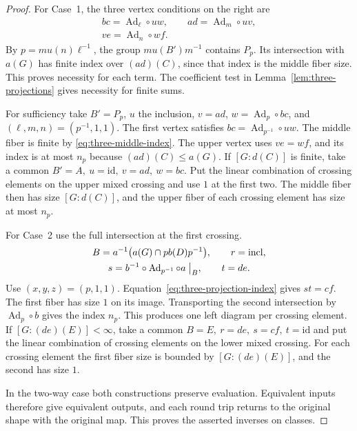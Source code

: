 \documentclass[11pt,a4paper]{article}
\numberwithin{equation}{section}
\theoremstyle{definition}
\newcommand{\id}{\mathrm{id}}
\begin{document}
\begin{proof}
For Case~1, the three vertex conditions on the right are
\[
 \begin{gathered}
 bc=\operatorname{Ad}_{\ell}\circ uw,\qquad
 ad=\operatorname{Ad}_{m}\circ uv,\\
 ve=\operatorname{Ad}_{n}\circ wf .
 \end{gathered}
\]
By \(p=m u(n)\ell^{-1}\), the group \(m u(B')m^{-1}\)
contains \(P_p\). Its intersection with \(a(G)\) has finite index
over \((ad)(C)\), since that index is the middle fiber size.
This proves necessity for each term. The coefficient test in
Lemma~\ref{lem:three-projections} gives necessity for finite sums.

For sufficiency take \(B'=P_p\), \(u\) the inclusion, \(v=ad\),
\(w=\operatorname{Ad}_p\circ bc\), and \((\ell,m,n)=(p^{-1},1,1)\).
The first vertex satisfies \(bc=\operatorname{Ad}_{p^{-1}}\circ uw\).
The middle fiber is finite by \eqref{eq:three-middle-index}.
The upper vertex uses \(ve=wf\), and its index is at most \(n_p\)
because \((ad)(C)\le a(G)\). If \([G:d(C)]\) is finite, take a
common \(B'=A,\ u=\id,\ v=ad,\ w=bc\). Put the linear combination
of crossing elements on the upper mixed crossing and use \(1\) at the first two.
The middle fiber then has size \([G:d(C)]\), and the upper fiber
of each crossing element has size at most \(n_p\).

For Case~2 use the full intersection at the first crossing.
\[
 \begin{gathered}
 B=a^{-1}\bigl(a(G)\cap p b(D)p^{-1}\bigr),\qquad r=\mathrm{incl},\\
 s=b^{-1}\circ\operatorname{Ad}_{p^{-1}}\circ a\bigm|_B,\qquad t=de.
 \end{gathered}
\]
Use \((x,y,z)=(p,1,1)\). Equation~\eqref{eq:three-projection-index}
gives \(st=cf\). The first fiber has size \(1\) on its image.
Transporting the second intersection by \(\operatorname{Ad}_p\circ b\)
gives the index \(n_p\). This produces one left diagram per crossing element.
If \([G:(de)(E)]<\infty\), take a common \(B=E,\ r=de,\ s=cf,\ t=\id\)
and put the linear combination of crossing elements on the lower mixed crossing.
For each crossing element the first fiber size is bounded by \([G:(de)(E)]\),
and the second has size \(1\).

In the two-way case both constructions preserve evaluation.
Equivalent inputs therefore give equivalent outputs, and each
round trip returns to the original shape with the original map.
This proves the asserted inverses on classes.
\end{proof}
\end{document}
